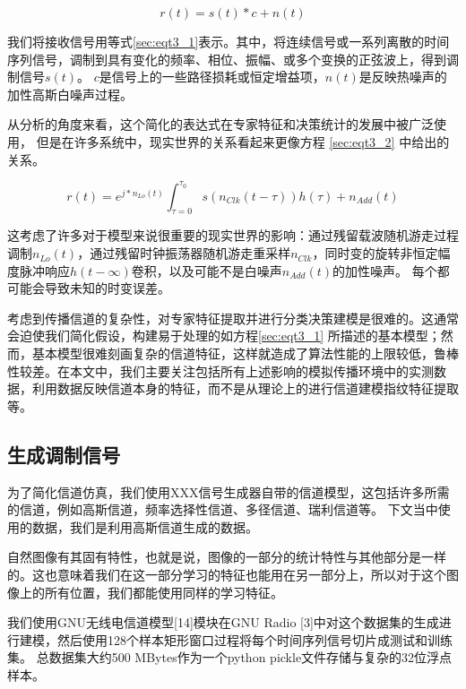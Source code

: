 \begin{equation}\label{sec:eqt3_1}
r(t) = s(t)*c + n(t)
\end{equation}

我们将接收信号用等式\ref{sec:eqt3_1}表示。其中，将连续信号或一系列离散的时间序列信号，调制到具有变化的频率、相位、振幅、或多个变换的正弦波上，得到调制信号$s(t)$。
 $c$是信号上的一些路径损耗或恒定增益项，$n(t)$是反映热噪声的加性高斯白噪声过程。\par

从分析的角度来看，这个简化的表达式在专家特征和决策统计的发展中被广泛使用，
但是在许多系统中，现实世界的关系看起来更像方程 \ref{sec:eqt3_2} 中给出的关系。\par

\begin{equation}\label{sec:eqt3_2}
	r(t) = e^{j*n_{Lo}(t)} \int_{\tau=0}^{\tau_{0}} s(n_{Clk}(t-\tau))h(\tau) + n_{Add}(t)
\end{equation}

这考虑了许多对于模型来说很重要的现实世界的影响：通过残留载波随机游走过程调制$n_{Lo}(t)$，通过残留时钟振荡器随机游走重采样$n_{Clk}$，同时变的旋转非恒定幅度脉冲响应$h(t-∞)$卷积，以及可能不是白噪声$n_{Add}(t)$的加性噪声。 每个都可能会导致未知的时变误差。\par

考虑到传播信道的复杂性，对专家特征提取并进行分类决策建模是很难的。这通常会迫使我们简化假设，构建易于处理的如方程\ref{sec:eqt3_1} 所描述的基本模型；然而，基本模型很难刻画复杂的信道特征，这样就造成了算法性能的上限较低，鲁棒性较差。在本文中，我们主要关注包括所有上述影响的模拟传播环境中的实测数据，利用数据反映信道本身的特征，而不是从理论上的进行信道建模指纹特征提取等。\par


\subsection{生成调制信号}

为了简化信道仿真，我们使用XXX信号生成器自带的信道模型，这包括许多所需的信道，例如高斯信道，频率选择性信道、多径信道、瑞利信道等。
下文当中使用的数据，我们是利用高斯信道生成的数据。\par

自然图像有其固有特性，也就是说，图像的一部分的统计特性与其他部分是一样的。这也意味着我们在这一部分学习的特征也能用在另一部分上，所以对于这个图像上的所有位置，我们都能使用同样的学习特征。

我们使用GNU无线电信道模型[14]模块在GNU Radio [3]中对这个数据集的生成进行建模，然后使用128个样本矩形窗口过程将每个时间序列信号切片成测试和训练集。 总数据集大约500 MBytes作为一个python pickle文件存储与复杂的32位浮点样本。\par

